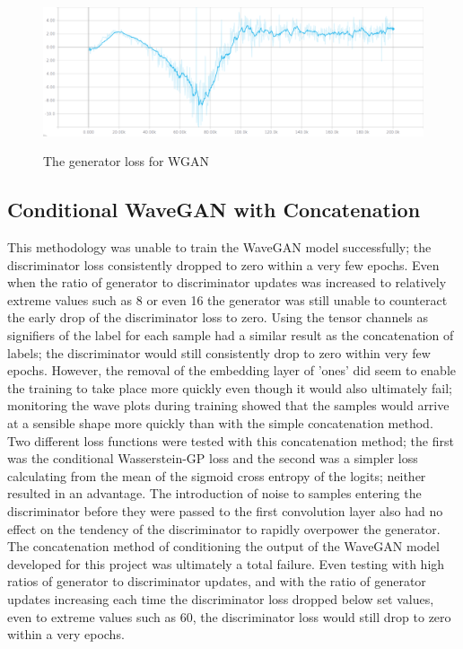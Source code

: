 \documentclass[a4paper, titlepage]{article}
\begin{document}
\newline
%
\begin{figure}[ht]%
  \caption{The generator loss for WGAN}
  \centering
  \includegraphics[width=1\textwidth, clip]{WGAN-Gen-Loss}
  \label{fig:WGAN-Gen-Loss}%
\end{figure}

\subsection{Conditional WaveGAN with Concatenation}

This methodology was unable to train the WaveGAN model successfully; the discriminator loss consistently dropped to zero within a very few epochs.
Even when the ratio of generator to discriminator updates was increased to relatively extreme values such as 8 or even 16 the generator was still unable to counteract the early drop of the discriminator loss to zero.
\newline
\newline
Using the tensor channels as signifiers of the label for each sample had a similar result as the concatenation of labels; the discriminator would still consistently drop to zero within very few epochs.
However, the removal of the embedding layer of 'ones' did seem to enable the training to take place more quickly even though it would also ultimately fail; monitoring the wave plots during training showed that the samples would arrive at a sensible shape more quickly than with the simple concatenation method.
\newline
\newline
Two different loss functions were tested with this concatenation method; the first was the conditional Wasserstein-GP loss and the second was a simpler loss calculating from the mean of the sigmoid cross entropy of the logits; neither resulted in an advantage.
The introduction of noise to samples entering the discriminator before they were passed to the first convolution layer also had no effect on the tendency of the discriminator to rapidly overpower the generator.
\newline
\newline
The concatenation method of conditioning the output of the WaveGAN model developed for this project was ultimately a total failure.
Even testing with high ratios of generator to discriminator updates, and with the ratio of generator updates increasing each time the discriminator loss dropped below set values, even to extreme values such as 60, the discriminator loss would still drop to zero within a very epochs.
\end{document}
